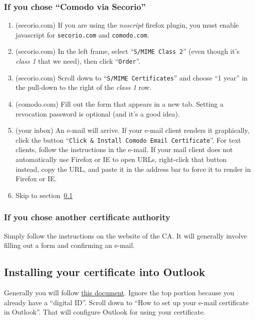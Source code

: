 \documentclass[pdftex,12pt,titlepage=false]{scrartcl}
\begin{document}
\subsubsection{If you chose ``Comodo via Secorio''}
\begin{multicols}{2}
  \begin{enumerate}
  \item (secorio.com) If you are using the \emph{noscript} firefox
    plugin, you must enable javascript for \texttt{secorio.com} and
    \texttt{comodo.com}.
  \item (secorio.com) In the left frame, select ``\texttt{S/MIME Class
      2}'' (even though it's \emph{class 1} that we need), then click
    ``\texttt{Order}''.
  \item (secorio.com) Scroll down to ``\texttt{S/MIME Certificates}''
    and choose ``1 year'' in the pull-down to the right of the
    \emph{class 1} row.
  \item (comodo.com) Fill out the form that appears in a new tab.
    Setting a revocation password is optional (and it's a good
    idea).%
  \item (your inbox) An e-mail will arrive.  If your e-mail client
    renders it graphically, click the button ``\texttt{Click \&
      Install Comodo Email Certificate}''.  For text clients, follow
    the instructions in the e-mail.  If your mail client does not
    automatically use Firefox or IE to open URLs, right-click that
    button instead, copy the URL, and paste it in the address bar to
    force it to render in Firefox or IE.
  \item Skip to section~\ref{browser_export}
  \end{enumerate}
\end{multicols}

\subsubsection{If you chose another certificate authority}
Simply follow the instructions on the website of the CA.  It will
generally involve filling out a form and confirming an e-mail.

\subsection{Installing your certificate into Outlook}\label{browser_export}

Generally you will follow
\href{https://www.ablebits.com/office-addins-blog/2014/04/11/email-encryption-outlook/}{this
  document}.  Ignore the top portion because you already have a
``digital ID''.  Scroll down to ``How to set up your e-mail
certificate in Outlook''.  That will configure Outlook for using your
certificate.
\end{document}
